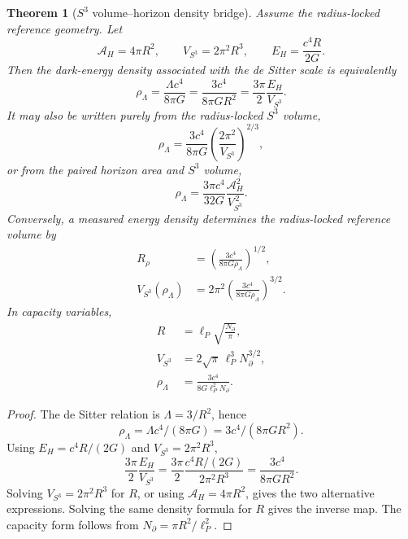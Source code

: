 \documentclass[aps,prd,reprint,nofootinbib,superscriptaddress,floatfix]{revtex4-2}
\numberwithin{equation}{section}
\theoremstyle{definition}
\theoremstyle{plain}
\newtheorem{theorem}{Theorem}[section]
\begin{document}
\begin{theorem}[\texorpdfstring{\(S^3\)}{S3} volume--horizon density bridge]
\label{thm:s3-volume-density-bridge}
Assume the radius-locked reference geometry.  Let
\[
\mathcal A_H=4\pi R^2,\qquad
V_{S^3}=2\pi^2R^3,\qquad
E_H=\frac{c^4R}{2G}.
\]
Then the dark-energy density associated with the de Sitter scale is
equivalently
\begin{equation}
\boxed{
\rho_\Lambda
=
\frac{\Lambda c^4}{8\pi G}
=
\frac{3c^4}{8\pi G R^2}
=
\frac{3\pi}{2}\frac{E_H}{V_{S^3}} .
}
\end{equation}
It may also be written purely from the radius-locked \(S^3\) volume,
\begin{equation}
\boxed{
\rho_\Lambda
=
\frac{3c^4}{8\pi G}
\left(\frac{2\pi^2}{V_{S^3}}\right)^{2/3},
}
\end{equation}
or from the paired horizon area and \(S^3\) volume,
\begin{equation}
\boxed{
\rho_\Lambda
=
\frac{3\pi c^4}{32G}
\frac{\mathcal A_H^2}{V_{S^3}^{\,2}} .
}
\end{equation}
Conversely, a measured energy density determines the radius-locked reference
volume by
\begin{equation}
\boxed{
\begin{aligned}
R_\rho&=
\left(\frac{3c^4}{8\pi G\rho_\Lambda}\right)^{1/2},\\
V_{S^3}(\rho_\Lambda)
&=
2\pi^2
\left(\frac{3c^4}{8\pi G\rho_\Lambda}\right)^{3/2}.
\end{aligned}}
\end{equation}
In capacity variables,
\begin{equation}
\boxed{
\begin{aligned}
R&=\ell_P\sqrt{\frac{N_\partial}{\pi}},\\
V_{S^3}&=2\sqrt{\pi}\,\ell_P^3N_\partial^{3/2},\\
\rho_\Lambda&=\frac{3c^4}{8G\ell_P^2N_\partial}.
\end{aligned}}
\end{equation}
\end{theorem}

\begin{proof}
The de Sitter relation is \(\Lambda=3/R^2\), hence
\[
\rho_\Lambda=\Lambda c^4/(8\pi G)=3c^4/(8\pi G R^2).
\]
Using \(E_H=c^4R/(2G)\) and \(V_{S^3}=2\pi^2R^3\),
\[
\frac{3\pi}{2}\frac{E_H}{V_{S^3}}
=
\frac{3\pi}{2}
\frac{c^4R/(2G)}{2\pi^2R^3}
=
\frac{3c^4}{8\pi G R^2}.
\]
Solving \(V_{S^3}=2\pi^2R^3\) for \(R\), or using
\(\mathcal A_H=4\pi R^2\), gives the two alternative expressions.  Solving
the same density formula for \(R\) gives the inverse map.  The capacity form
follows from \(N_\partial=\pi R^2/\ell_P^2\).
\end{proof}
\end{document}
